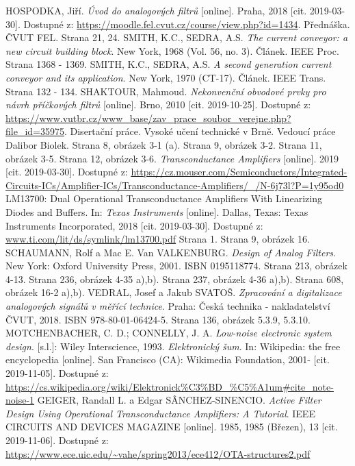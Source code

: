 \begin{thebibliography}{999}
HOSPODKA, Jiří. \textit{Úvod do analogových filtrů} [online]. Praha, 2018 [cit. 2019-03-30]. Dostupné z: \url{https://moodle.fel.cvut.cz/course/view.php?id=1434}. Přednáška. ČVUT FEL. Strana 21, 24.
SMITH, K.C., SEDRA, A.S. \textit{The current conveyor: a new circuit building block}. New York, 1968 (Vol. 56, no. 3). Článek. IEEE Proc. Strana 1368 - 1369.
SMITH, K.C., SEDRA, A.S. \textit{A second generation current conveyor and its application}. New York, 1970 (CT-17). Článek. IEEE Trans. Strana 132 - 134.
SHAKTOUR, Mahmoud. \textit{Nekonvenční obvodové prvky pro návrh příčkových filtrů} [online]. Brno, 2010 [cit. 2019-10-25]. Dostupné z: \url{https://www.vutbr.cz/www_base/zav_prace_soubor_verejne.php?file_id=35975}. Disertační práce. Vysoké učení technické v Brně. Vedoucí práce Dalibor Biolek. Strana 8, obrázek 3-1 (a). Strana 9, obrázek 3-2. Strana 11, obrázek 3-5. Strana 12, obrázek 3-6.
\textit{Transconductance Amplifiers} [online]. 2019 [cit. 2019-03-30]. Dostupné z: \url{https://cz.mouser.com/Semiconductors/Integrated-Circuits-ICs/Amplifier-ICs/Transconductance-Amplifiers/_/N-6j73l?P=1y95od0}
LM13700: Dual Operational Transconductance Amplifiers With Linearizing Diodes and Buffers. In: \textit{Texas Instruments} [online]. Dallas, Texas: Texas Instruments Incorporated, 2018 [cit. 2019-03-30]. Dostupné z: \url{www.ti.com/lit/ds/symlink/lm13700.pdf} Strana 1. Strana 9, obrázek 16.
SCHAUMANN, Rolf a Mac E. Van VALKENBURG. \textit{Design of Analog Filters}. New York: Oxford University Press, 2001. ISBN 0195118774. Strana 213, obrázek 4-13. Strana 236, obrázek 4-35 a),b). Strana 237, obrázek 4-36 a),b). Strana 608, obrázek 16-2 a),b).
\renewcommand{\headrulewidth}{0pt}
\fancyhf{}
VEDRAL, Josef a Jakub SVATOŠ. \textit{Zpracování a digitalizace analogových signálů v měřící technice}. Praha: Česká technika - nakladatelství ČVUT, 2018. ISBN 978-80-01-06424-5. Strana 136, obrázek 5.3.9, 5.3.10.
MOTCHENBACHER, C. D.; CONNELLY, J. A. \textit{Low-noise electronic system design}. [s.l.]: Wiley Interscience, 1993.
\textit{Elektronický šum}. In: Wikipedia: the free encyclopedia [online]. San Francisco (CA): Wikimedia Foundation, 2001- [cit. 2019-11-05]. Dostupné z: \url{https://cs.wikipedia.org/wiki/Elektronick%C3%BD_%C5%A1um#cite_note-noise-1}
GEIGER, Randall L. a Edgar SÂNCHEZ-SINENCIO. \textit{Active Filter Design Using Operational Transconductance Amplifiers: A Tutorial}. IEEE CIRCUITS AND DEVICES MAGAZINE [online]. 1985, 1985 (Březen), 13 [cit. 2019-11-06]. Dostupné z: \url{https://www.ece.uic.edu/~vahe/spring2013/ece412/OTA-structures2.pdf}
\end{thebibliography}